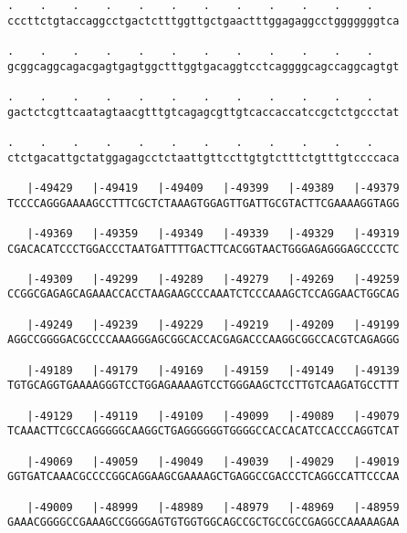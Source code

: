 \documentclass{article}
\begin{document}
\begin{Verbatim}
.    .    .    .    .    .    .    .    .    .    .    .    
cccttctgtaccaggcctgactctttggttgctgaactttggagaggcctgggggggtca
                                                            
.    .    .    .    .    .    .    .    .    .    .    .    
gcggcaggcagacgagtgagtggctttggtgacaggtcctcaggggcagccaggcagtgt
                                                            
.    .    .    .    .    .    .    .    .    .    .    .    
gactctcgttcaatagtaacgtttgtcagagcgttgtcaccaccatccgctctgccctat
                                                            
.    .    .    .    .    .    .    .    .    .    .    .    
ctctgacattgctatggagagcctctaattgttccttgtgtctttctgtttgtccccaca
                                                            
   |-49429   |-49419   |-49409   |-49399   |-49389   |-49379
TCCCCAGGGAAAAGCCTTTCGCTCTAAAGTGGAGTTGATTGCGTACTTCGAAAAGGTAGG
                                                            
   |-49369   |-49359   |-49349   |-49339   |-49329   |-49319
CGACACATCCCTGGACCCTAATGATTTTGACTTCACGGTAACTGGGAGAGGGAGCCCCTC
                                                            
   |-49309   |-49299   |-49289   |-49279   |-49269   |-49259
CCGGCGAGAGCAGAAACCACCTAAGAAGCCCAAATCTCCCAAAGCTCCAGGAACTGGCAG
                                                            
   |-49249   |-49239   |-49229   |-49219   |-49209   |-49199
AGGCCGGGGACGCCCCAAAGGGAGCGGCACCACGAGACCCAAGGCGGCCACGTCAGAGGG
                                                            
   |-49189   |-49179   |-49169   |-49159   |-49149   |-49139
TGTGCAGGTGAAAAGGGTCCTGGAGAAAAGTCCTGGGAAGCTCCTTGTCAAGATGCCTTT
                                                            
   |-49129   |-49119   |-49109   |-49099   |-49089   |-49079
TCAAACTTCGCCAGGGGGCAAGGCTGAGGGGGGTGGGGCCACCACATCCACCCAGGTCAT
                                                            
   |-49069   |-49059   |-49049   |-49039   |-49029   |-49019
GGTGATCAAACGCCCCGGCAGGAAGCGAAAAGCTGAGGCCGACCCTCAGGCCATTCCCAA
                                                            
   |-49009   |-48999   |-48989   |-48979   |-48969   |-48959
GAAACGGGGCCGAAAGCCGGGGAGTGTGGTGGCAGCCGCTGCCGCCGAGGCCAAAAAGAA
                                                            

\end{Verbatim}
\end{document}
